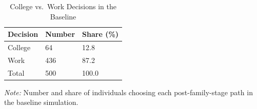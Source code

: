 \begin{table}[H]
    \centering
    \begin{threeparttable}
    \caption{College vs.\ Work Decisions in the Baseline}
    \label{tab:college_work_choice}
    \begin{tabular}{p{3cm} p{3cm} p{3cm}}
        \toprule\toprule
        \textbf{Decision} & \textbf{Number} & \textbf{Share (\%)} \\
        \midrule
        College & 64 & 12.8 \\
        Work & 436 & 87.2 \\
        \midrule
        Total & 500 & 100.0 \\
        \bottomrule\bottomrule
    \end{tabular}
    \begin{tablenotes}
        \footnotesize
        \item \textit{Note:} Number and share of individuals choosing each post-family-stage path in the baseline simulation.
    \end{tablenotes}
    \end{threeparttable}
\end{table}
